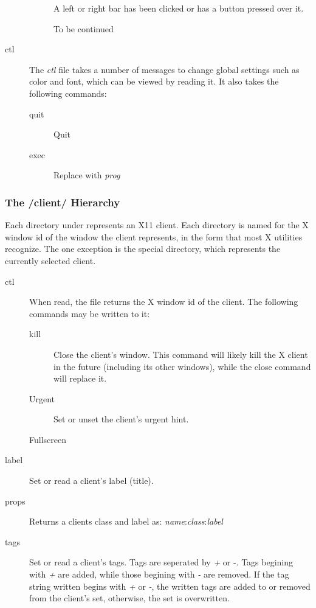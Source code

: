 \begin{description}
\begin{description}
		A left or right bar has been clicked or has a
		button pressed over it.
	\item[\Dots] To be continued\Dots
	\end{description}
\item[ctl] The \emph{ctl} file takes a number of messages to
	change global settings such as color and font, which can
	be viewed by reading it. It also takes the following
	commands:
	\begin{description}
	\item[quit] Quit 
	\item[exec ] Replace  with
		\emph{prog}
	\end{description}
\end{description}

\subsubsection{The /client/ Hierarchy}

Each directory under  represents an X11 client.
Each directory is named for the X window id of the window the
client represents, in the form that most X utilities recognize.
The one exception is the special  directory, which
represents the currently selected client.

\begin{description}
\item[ctl] When read, the  file returns the X window id
	of the client. The following commands may be written to
	it:
	\begin{description}
	\item[kill] Close the client's window. This command will
		likely kill the X client in the future
		(including its other windows), while the close
		command will replace it.
	\item[Urgent] Set or unset the client's urgent
		hint.
	\item[Fullscreen]

	\end{description}
\item[label] Set or read a client's label (title).
\item[props] Returns a clients class and label as:
	\emph{name}:\emph{class}:\emph{label}
\item[tags] Set or read a client's tags. Tags are seperated by
	\emph{+} or {-}. Tags begining with \emph{+} are added,
	while those begining with \emph{-} are removed. If the
	tag string written begins with \emph{+} or \emph{-}, the
	written tags are added to or removed from the client's
	set, otherwise, the set is overwritten.
\end{description}

